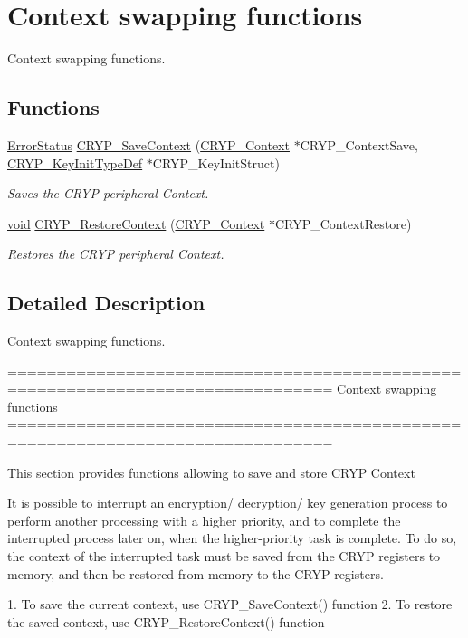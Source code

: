 \hypertarget{group___c_r_y_p___group3}{\section{Context swapping functions}
\label{group___c_r_y_p___group3}
}


Context swapping functions.  


\subsection*{Functions}
\begin{DoxyCompactItemize}
\item 
\hyperlink{group___exported__types_ga8333b96c67f83cba354b3407fcbb6ee8}{Error\-Status} \hyperlink{group___c_r_y_p___group3_ga41a14be7fa43d500e7c94cce40910ea8}{C\-R\-Y\-P\-\_\-\-Save\-Context} (\hyperlink{struct_c_r_y_p___context}{C\-R\-Y\-P\-\_\-\-Context} $\ast$C\-R\-Y\-P\-\_\-\-Context\-Save, \hyperlink{struct_c_r_y_p___key_init_type_def}{C\-R\-Y\-P\-\_\-\-Key\-Init\-Type\-Def} $\ast$C\-R\-Y\-P\-\_\-\-Key\-Init\-Struct)
\begin{DoxyCompactList}\small\item\em Saves the C\-R\-Y\-P peripheral Context. \end{DoxyCompactList}\item 
\hyperlink{group___n_a_m_e_ga18028b8badbf1ea7e704ccac3c488e82}{void} \hyperlink{group___c_r_y_p___group3_gaf2986782fa66ea95b2a389595e17e0e5}{C\-R\-Y\-P\-\_\-\-Restore\-Context} (\hyperlink{struct_c_r_y_p___context}{C\-R\-Y\-P\-\_\-\-Context} $\ast$C\-R\-Y\-P\-\_\-\-Context\-Restore)
\begin{DoxyCompactList}\small\item\em Restores the C\-R\-Y\-P peripheral Context. \end{DoxyCompactList}\end{DoxyCompactItemize}


\subsection{Detailed Description}
Context swapping functions. \begin{DoxyVerb} ===============================================================================
                             Context swapping functions
 ===============================================================================  

  This section provides functions allowing to save and store CRYP Context

  It is possible to interrupt an encryption/ decryption/ key generation process 
  to perform another processing with a higher priority, and to complete the 
  interrupted process later on, when the higher-priority task is complete. To do 
  so, the context of the interrupted task must be saved from the CRYP registers 
  to memory, and then be restored from memory to the CRYP registers.
   
  1. To save the current context, use CRYP_SaveContext() function
  2. To restore the saved context, use CRYP_RestoreContext() function \end{DoxyVerb}
 

